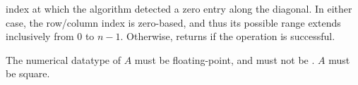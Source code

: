 \begin{flaspec}
{index at which the algorithm detected a zero entry along the diagonal.
In either case, the row/column index is zero-based, and thus its possible
range extends inclusively from $ 0 $ to $ n - 1 $.
Otherwise, \flashspdinv returns \flasuccess if the operation is successful.
}
\begin{checks}
\checkitem
The numerical datatype of $ A $ must be floating-point, and must not be
\flaconstantns.
\itemvsp
\checkitem
$ A $ must be square.
\end{checks}
\begin{params}
\end{params}
\end{flaspec}


